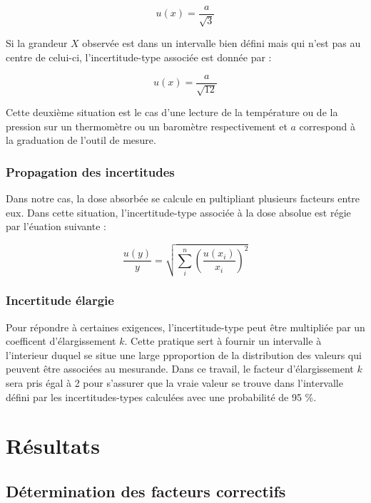 \documentclass{article}
\begin{document}
\begin{equation}
  u(x) = \dfrac{a}{\sqrt{3}}
\end{equation}

Si la grandeur $X$ observée est dans un intervalle bien défini mais qui n'est pas au centre de celui-ci, l'incertitude-type associée est donnée par :

\begin{equation}
  u(x) = \dfrac{a}{\sqrt{12}}
\end{equation}

Cette deuxième situation est le cas d'une lecture de la température ou de la pression sur un thermomètre ou un baromètre respectivement et $a$ correspond à la graduation de l'outil de mesure.

\subsubsection{Propagation des incertitudes}

Dans notre cas, la dose absorbée se calcule en pultipliant plusieurs facteurs entre eux. Dans cette situation, l'incertitude-type associée à la dose absolue est régie par l'éuation suivante :

\begin{equation}
  \dfrac{u(y)}{y} = \sqrt{\sum\limits_i^n \left( \dfrac{u(x_i)}{x_i} \right) ^2}
\end{equation}

\subsubsection{Incertitude élargie}

Pour répondre à certaines exigences, l'incertitude-type peut être multipliée par un coefficent d'élargissement $k$. Cette pratique sert à fournir un intervalle à l'interieur duquel se situe une large pproportion de la distribution des valeurs qui peuvent être associées au mesurande. Dans ce travail, le facteur d'élargissement $k$ sera pris égal à 2 pour s'assurer que la vraie valeur se trouve dans l'intervalle défini par les incertitudes-types calculées avec une probabilité de 95 \%.

\newpage
\section{Résultats}
\subsection{Détermination des facteurs correctifs}
\end{document}
